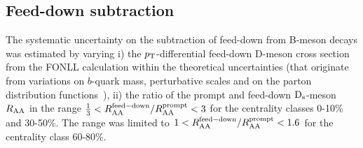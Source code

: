 \subsection{Feed-down subtraction}
\label{sec:FDsystAA}
The systematic uncertainty on the subtraction of feed-down from 
B-meson decays was estimated by varying i)
the $p_{\rm T}$-differential feed-down D-meson cross section from the 
FONLL calculation within the theoretical uncertainties (that originate from variations on 
$b$-quark mass, perturbative scales and on the parton distribution functions~\cite{Cacciari:2012ny}), 
ii) the ratio of the prompt and feed-down ${\rm D_s}$-meson $R_{\rm AA}$ in the 
range $\frac{1}{3} < R_{\rm AA}^{\rm  feed-down}/R_{\rm AA}^{\rm prompt} < 3$ 
for the centrality classes 0-10\% and 30-50\%. The range was limited to 
$1 < R_{\rm AA}^{\rm  feed-down} / R_{\rm AA}^{\rm prompt} < 1.6$ 
for the centrality class 60-80\%. 

